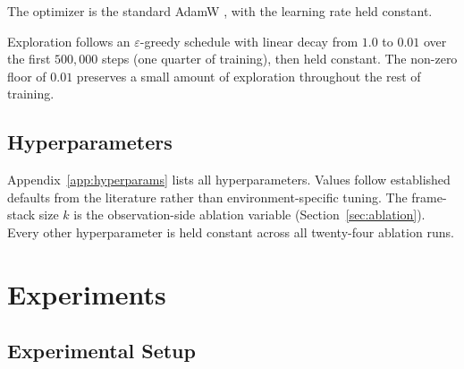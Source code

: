 \documentclass[12pt,a4paper,titlepage]{article}
\begin{document}
The optimizer is the standard AdamW \citep{Loshchilov2019}, with the learning rate held constant.

Exploration follows an $\varepsilon$-greedy schedule with linear decay from $1.0$ to $0.01$ over the first $500{,}000$ steps (one quarter of training), then held constant. The non-zero floor of $0.01$ preserves a small amount of exploration throughout the rest of training.

\subsection{Hyperparameters}
\label{sec:hyperparameters}

Appendix~\ref{app:hyperparams} lists all hyperparameters. Values follow established defaults from the literature rather than environment-specific tuning. The frame-stack size $k$ is the observation-side ablation variable (Section~\ref{sec:ablation}). Every other hyperparameter is held constant across all twenty-four ablation runs.

\section{Experiments}
\label{sec:experiments}

\subsection{Experimental Setup}
\label{sec:setup}
\end{document}
